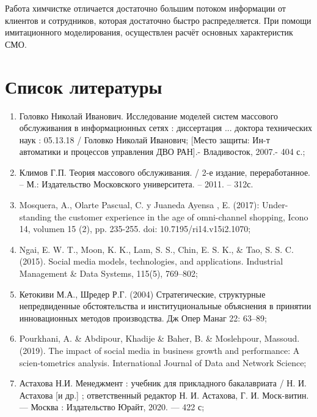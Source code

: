 \documentclass[14pt]{extarticle}
\begin{document}
    Работа химчистке отличается достаточно большим потоком информации от клиентов и сотрудников, которая достаточно быстро распределяется. При помощи имитационного моделирования, осуществлен расчёт основных характеристик СМО.

    \newpage
    \section*{Список литературы}

    \begin{enumerate}
        \item Головко Николай Иванович. Исследование моделей систем массового обслуживания в информационных сетях : диссертация ... доктора технических наук : 05.13.18 / Головко Николай Иванович; [Место защиты: Ин-т автоматики и процессов управления ДВО РАН].- Владивосток, 2007.- 404 с.;
        \item Климов Г.П. Теория массового обслуживания. / 2-е издание, переработанное. – М.: Издательство Московского университета. – 2011. – 312с.
        \item Mosquera, A., Olarte Pascual, C. y Juaneda Ayensa , E. (2017): Under-standing the customer experience in the age of omni-channel shopping, Icono 14, volumen 15 (2), pp. 235-255. doi: 10.7195/ri14.v15i2.1070;
        \item Ngai, E. W. T., Moon, K. K., Lam, S. S., Chin, E. S. K., \& Tao, S. S. C. (2015). Social media models, technologies, and applications. Industrial Management \& Data Systems, 115(5), 769–802;
        \item Кетокиви  М.А.,  Шредер  Р.Г.  (2004)  Стратегические,  структурные непредвиденные обстоятельства и институциональные объяснения в принятии инновационных методов производства. Дж Опер Манаг 22: 63–89;
        \item Pourkhani, A. \& Abdipour, Khadije \& Baher, B. \& Moslehpour, Massoud. (2019). The impact of social media in business growth and performance: A scien-tometrics analysis. International Journal of Data and Network Science;
        \item Астахова Н.И. Менеджмент : учебник для прикладного бакалавриата / Н. И. Астахова [и др.] ; ответственный редактор Н. И. Астахова, Г. И. Моск-витин. — Москва : Издательство Юрайт, 2020. — 422 с;
    \end{enumerate}
\end{document}
